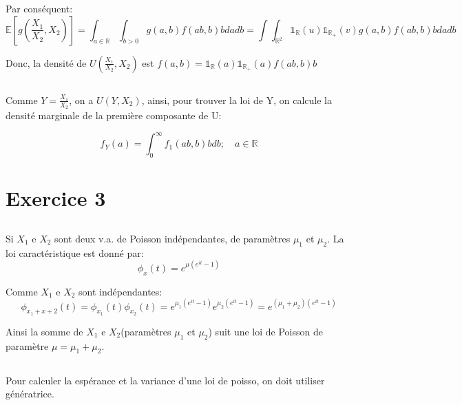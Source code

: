 \documentclass[a4paper]{article}
\begin{document}

Par conséquent:
\begin{equation}
 \mathbb{E}[g(\frac{X_1}{X_2},X_2)]=\int_{a            \in           \mathbb{R}}
 \int_{b>0}g(a,b)f(ab,b)bdadb=\int \int_{\mathbb{R}^2} \mathds{1}_\mathbb{R}(u)\mathds{1}_{\mathbb{R}_+}(v)g(a,b)f(ab,b)bdadb
\end{equation}

Donc, la densité de $U(\frac{X_1}{X_2},X_2)$ est $f(a,b)=\mathds{1}_\mathbb{R}(a)\mathds{1}_{\mathbb{R}_+}(a)f(ab,b)b$

\subsection{}

Comme $Y=\frac{X_1}{X_2}$, on a $U(Y,X_2)$, ainsi,  pour trouver la loi de Y, on
calcule la densité marginale de la première composante de U:

\begin{equation}
f_Y(a)=\int_0^\infty f_1(ab,b)bdb ; \quad a \in \mathbb{R}
\end{equation}


\section{Exercice 3}

\subsection{}
Si $X_1$ e $X_2$ sont deux  v.a. de Poisson indépendantes, de paramètres $\mu_1$
et $\mu_2$. La loi caractéristique est donné par:
\begin{equation}
  \phi_x(t)=e^{\mu(e^{it}-1)}
\end{equation}

Comme $X_1$ e $X_2$ sont indépendantes:
\begin{equation}
  \phi_{x_1+x+2}(t)=\phi_{x_1}(t)\phi_{x_2}(t)=e^{\mu_1(e^{it}-1)}e^{\mu_2(e^{it}-1)}=
  e^{(\mu_1+\mu_2)(e^{it}-1)}
\end{equation}

Ainsi la somme  de $X_1$ e $X_2$(paramètres $\mu_1$ et $\mu_2$)  suit une loi de
Poisson de paramètre $\mu=\mu_1+\mu_2$.

\subsection{}
Pour calculer la espérance et la  variance d'une loi de poisso, on doit utiliser
génératrice.
\end{document}
